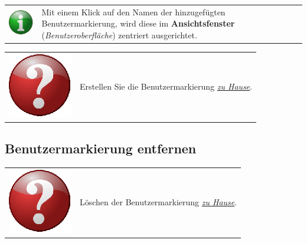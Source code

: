 \documentclass[10pt]{scrreprt}
\newcommand{\textref}[1]{\mbox{\raisebox{0.1ex}{\small$\rightarrow$ }\textit{#1}}}
\begin{document}
\vspace{3mm}
\begin{tabular}{>{\centering \arraybackslash}m{1cm} m{14cm}}
\includegraphics[scale=0.5]{images/info.eps} & Mit einem Klick auf den Namen der hinzugefügten Benutzermarkierung, wird diese im \textbf{Ansichtsfenster} (\textref{Benutzeroberfläche}) zentriert ausgerichtet.
\end{tabular}

\vspace{3mm}
\begin{tabular}{>{\centering \arraybackslash}m{1cm} m{14cm}}
\includegraphics[scale=0.5]{images/quest.eps} & Erstellen Sie die Benutzermarkierung \underline{\textit{zu Hause}}.
\end{tabular}



\vspace{3mm}
\subsection{Benutzermarkierung entfernen}  

\vspace{3mm}
\begin{tabular}{>{\centering \arraybackslash}m{1cm} m{14cm}}
\includegraphics[scale=0.5]{images/quest.eps} & Löschen der Benutzermarkierung \underline{\textit{zu Hause}}.
\end{tabular}
\end{document}
